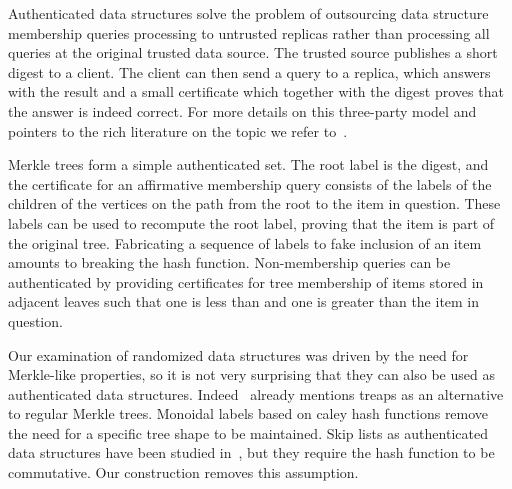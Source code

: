 Authenticated data structures solve the problem of outsourcing data structure membership queries processing to untrusted replicas rather than processing all queries at the original trusted data source. The trusted source publishes a short digest to a client. The client can then send a query to a replica, which answers with the result and a small certificate which together with the digest proves that the answer is indeed correct. For more details on this three-party model and pointers to the rich literature on the topic we refer to~\cite{martel2004general}.

Merkle trees form a simple authenticated set. The root label is the digest, and the certificate for an affirmative membership query consists of the labels of the children of the vertices on the path from the root to the item in question. These labels can be used to recompute the root label, proving that the item is part of the original tree. Fabricating a sequence of labels to fake inclusion of an item amounts to breaking the hash function. Non-membership queries can be authenticated by providing certificates for tree membership of items stored in adjacent leaves such that one is less than and one is greater than the item in question.

Our examination of randomized data structures was driven by the need for Merkle-like properties, so it is not very surprising that they can also be used as authenticated data structures. Indeed~\cite{naor2000certificate} already mentions treaps as an alternative to regular Merkle trees. Monoidal labels based on caley hash functions remove the need for a specific tree shape to be maintained. Skip lists as authenticated data structures have been studied in~\cite{goodrich2000efficient}, but they require the hash function to be commutative. Our construction removes this assumption.
